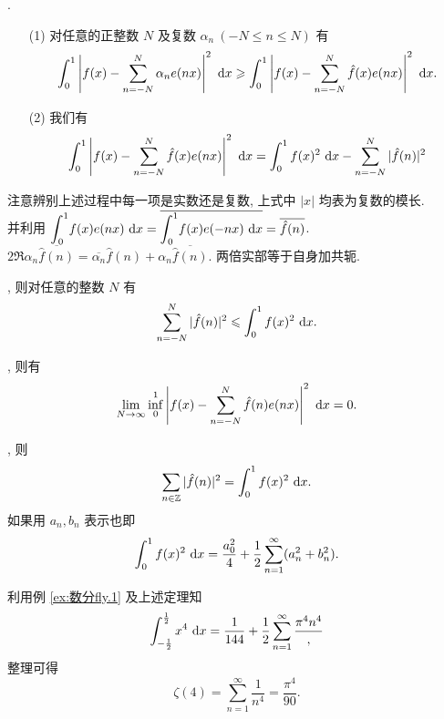 \begin{theorem}
	\tiaojian.
	\begin{itemize}
		\item[(1)] 对任意的正整数 $N$ 及复数 $\alpha_n\ (-N\leqslant n\leqslant N)$ 有
		$$\int_0^1\left|f(x)-\sum\limits_{n=-N}^N \alpha_n e(nx)\right|^2\td x\geqslant\int_0^1\left|f(x)-\sum\limits_{n=-N}^N\hat f(x)e(nx)\right|^2\td x.$$
		\item[(2)] 我们有 $$\int_0^1\left|f(x)-\sum\limits_{n=-N}^N\hat f(x)e(nx)\right|^2\td x=\int_0^1 f(x)^2\td x-\sum\limits_{n=-N}^N|\hat f(n)|^2$$
	\end{itemize}
\end{theorem}

\begin{remark*}
	注意辨别上述过程中每一项是实数还是复数, 上式中 $|x|$ 均表为复数的模长.\\[10pt]
	
	并利用 $\mint[0]^1 f(x)e(nx)\td x=\overline{\mint[0]^1 f(x)e(-nx)\td x}=\overline{\hat f(n)}$.\\[10pt]
	
	$2\Re \alpha_n\overline{\hat f(n)}=\overline{\alpha_n}\hat f(n)+\alpha_n\overline{\hat f(n)}$. 两倍实部等于自身加共轭.
\end{remark*}

\begin{theorem}\label{贝塞尔不等式}
	\tiaojian, 则对任意的整数 $N$ 有 $$\sum\limits_{n=-N}^N|\hat f(n)|^2\leqslant\int_0^1 f(x)^2\td x.$$
\end{theorem}

\begin{theorem}
	\tiaojian, 则有\begin{equation}
		\lim\limits_{N\to \infty}\inf_0^1\left|f(x)-\sum\limits_{n=-N}^N \hat f(n)e(nx)\right|^2\td x = 0.
	\end{equation}
\end{theorem}

\begin{theorem}\label{帕塞瓦尔恒等式}
	\tiaojian, 则 $$\sum\limits_{n\in\Z}|\hat f(n)|^2=\int_0^1f(x)^2\td x.$$ 如果用 $a_n,b_n$ 表示也即
	\begin{equation}
		\int_0^1 f(x)^2\td x=\frac{a_0^2} 4+\frac 1 2\sum\limits_{n=1}^{\infty}(a_n^2+b_n^2).
	\end{equation}
\end{theorem}

\begin{example}
	利用例 \ref{ex:数分fly.1} 及上述定理知 $$\int_{-\frac 12}^{\frac 12} x^4\td x=\frac 1 {144}+\frac 1 2\sum\limits_{n=1}^\infty \frac{\pi^4n^4},$$ 整理可得 $$\zeta(4)=\sum\limits_{n=1}^\infty\frac1 {n^4}=\frac{\pi^4}{90}.$$
\end{example}

